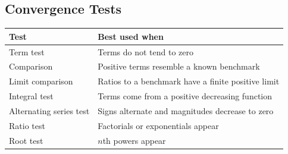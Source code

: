 \subsection*{Convergence Tests}

\begin{center}
\begin{tabular}{ll}
\toprule
Test & Best used when \\
\midrule
Term test & Terms do not tend to zero \\
Comparison & Positive terms resemble a known benchmark \\
Limit comparison & Ratios to a benchmark have a finite positive limit \\
Integral test & Terms come from a positive decreasing function \\
Alternating series test & Signs alternate and magnitudes decrease to zero \\
Ratio test & Factorials or exponentials appear \\
Root test & \(n\)th powers appear \\
\bottomrule
\end{tabular}
\end{center}

